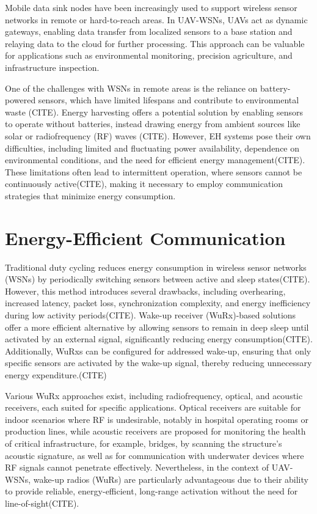 \documentclass[conference]{IEEEtran}
\begin{document}
Mobile data sink nodes have been increasingly used to support wireless sensor networks in remote or hard-to-reach areas\cite{gradys,uav_wsn_survey,survey_monitoring_uavwsn}. In UAV-WSNs, UAVs act as dynamic gateways, enabling data transfer from localized sensors to a base station and relaying data to the cloud for further processing. This approach can be valuable for applications such as environmental monitoring\cite{flood_forecasting_uavwsn,rural_environmental_monitoring_uavwsn}, precision agriculture\cite{agriculture_uavwsn}, and infrastructure inspection\cite{structure_monitoring_uavwsn}.

One of the challenges with WSNs in remote areas is the reliance on battery-powered sensors, which have limited lifespans and contribute to environmental waste (CITE). Energy harvesting offers a potential solution by enabling sensors to operate without batteries, instead drawing energy from ambient sources like solar or radiofrequency (RF) waves (CITE). However, EH systems pose their own difficulties, including limited and fluctuating power availability, dependence on environmental conditions, and the need for efficient energy management(CITE). These limitations often lead to intermittent operation, where sensors cannot be continuously active(CITE), making it necessary to employ communication strategies that minimize energy consumption.

\section{Energy-Efficient Communication}

Traditional duty cycling reduces energy consumption in wireless sensor networks (WSNs) by periodically switching sensors between active and sleep states(CITE). However, this method introduces several drawbacks, including overhearing, increased latency, packet loss, synchronization complexity, and energy inefficiency during low activity periods(CITE). Wake-up receiver (WuRx)-based solutions offer a more efficient alternative by allowing sensors to remain in deep sleep until activated by an external signal, significantly reducing energy consumption(CITE). Additionally, WuRxs can be configured for addressed wake-up, ensuring that only specific sensors are activated by the wake-up signal, thereby reducing unnecessary energy expenditure.(CITE)

Various WuRx approaches exist, including radiofrequency, optical, and acoustic receivers, each suited for specific applications\cite{overview_wurx_survey}. Optical receivers are suitable for indoor scenarios where RF is undesirable\cite{optical_wurx}, notably in hospital operating rooms or production lines, while acoustic receivers are proposed for monitoring the health of critical infrastructure, for example, bridges, by scanning the structure's acoustic signature\cite{acoustic_wurx_structure}, as well as for communication with underwater devices where RF signals cannot penetrate effectively\cite{acoustic_wurx_underwater}. Nevertheless, in the context of UAV-WSNs, wake-up radios (WuRs) are particularly advantageous due to their ability to provide reliable, energy-efficient, long-range activation without the need for line-of-sight(CITE).
\end{document}
